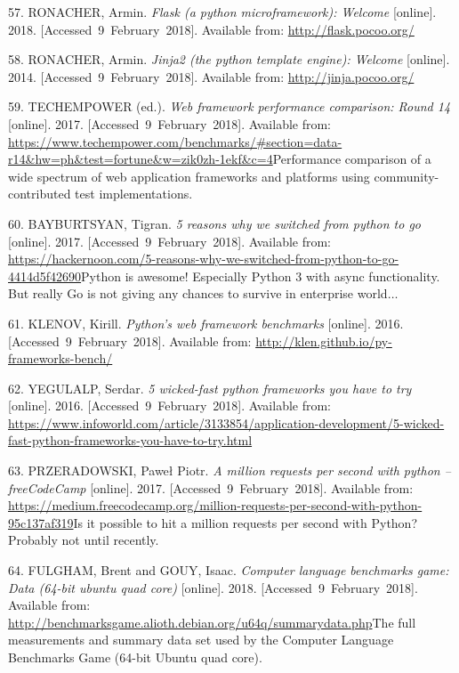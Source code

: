 \documentclass[american,a4paper,oneside,,tablecaptionabove]{scrbook}
\begin{document}
\hypertarget{ref-Ronacher.2018}{}
57. RONACHER, Armin. \emph{Flask (a python microframework): Welcome}
{[}online{]}. 2018. {[}Accessed~9~February~2018{]}. Available from:
\url{http://flask.pocoo.org/}

\hypertarget{ref-Ronacher.2014}{}
58. RONACHER, Armin. \emph{Jinja2 (the python template engine): Welcome}
{[}online{]}. 2014. {[}Accessed~9~February~2018{]}. Available from:
\url{http://jinja.pocoo.org/}

\hypertarget{ref-TechEmpower.2017}{}
59. TECHEMPOWER (ed.). \emph{Web framework performance comparison: Round
14} {[}online{]}. 2017. {[}Accessed~9~February~2018{]}. Available from:
\url{https://www.techempower.com/benchmarks/\#section=data-r14\&hw=ph\&test=fortune\&w=zik0zh-1ekf\&c=4}Performance
comparison of a wide spectrum of web application frameworks and
platforms using community-contributed test implementations.

\hypertarget{ref-Bayburtsyan.2017}{}
60. BAYBURTSYAN, Tigran. \emph{5 reasons why we switched from python to
go} {[}online{]}. 2017. {[}Accessed~9~February~2018{]}. Available from:
\url{https://hackernoon.com/5-reasons-why-we-switched-from-python-to-go-4414d5f42690}Python
is awesome! Especially Python 3 with async functionality. But really Go
is not giving any chances to survive in enterprise world\(\ldots\)

\hypertarget{ref-Klenov.2016}{}
61. KLENOV, Kirill. \emph{Python's web framework benchmarks}
{[}online{]}. 2016. {[}Accessed~9~February~2018{]}. Available from:
\url{http://klen.github.io/py-frameworks-bench/}

\hypertarget{ref-Yegulalp.2016}{}
62. YEGULALP, Serdar. \emph{5 wicked-fast python frameworks you have to
try} {[}online{]}. 2016. {[}Accessed~9~February~2018{]}. Available from:
\url{https://www.infoworld.com/article/3133854/application-development/5-wicked-fast-python-frameworks-you-have-to-try.html}

\hypertarget{ref-Przeradowski.2017}{}
63. PRZERADOWSKI, Paweł Piotr. \emph{A million requests per second with
python -- freeCodeCamp} {[}online{]}. 2017.
{[}Accessed~9~February~2018{]}. Available from:
\url{https://medium.freecodecamp.org/million-requests-per-second-with-python-95c137af319}Is
it possible to hit a million requests per second with Python? Probably
not until recently.

\hypertarget{ref-Fulgham.2018}{}
64. FULGHAM, Brent and GOUY, Isaac. \emph{Computer language benchmarks
game: Data (64-bit ubuntu quad core)} {[}online{]}. 2018.
{[}Accessed~9~February~2018{]}. Available from:
\url{http://benchmarksgame.alioth.debian.org/u64q/summarydata.php}The
full measurements and summary data set used by the Computer Language
Benchmarks Game (64-bit Ubuntu quad core).
\end{document}
